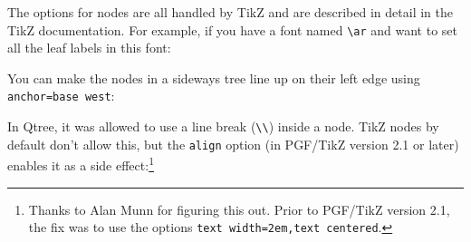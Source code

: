 \documentclass{article}
\begin{document}
The options for nodes are all handled by TikZ and are
described in detail in the TikZ documentation. For example, if you
have a font named \verb|\ar| and want to set all the leaf labels in
this font:
\begin{center}
\begin{SideBySideExample}
\end{SideBySideExample}
\end{center}

You can make the nodes in a sideways tree line up on their left edge using \verb|anchor=base west|:
\begin{center}
\begin{SideBySideExample}
\end{SideBySideExample}
\end{center}

In Qtree, it was allowed to use a line break (\verb|\\|) inside a node. TikZ nodes by default don't allow this, but the \verb|align| option (in PGF/TikZ version 2.1 or later) enables it as a side effect:\footnote{Thanks to Alan Munn for figuring this out. Prior to PGF/TikZ version 2.1, the fix was to use the options \verb|text width=2em,text centered|.}
\begin{center}
\begin{SideBySideExample}
\end{SideBySideExample}
\end{center}
\end{document}
